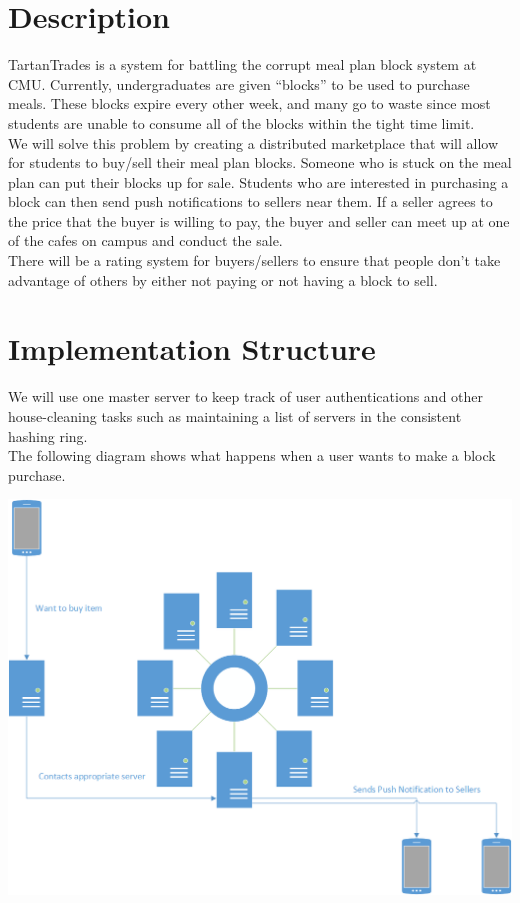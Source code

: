 \documentclass[12pt]{article}
\begin{document}
\maketitle

\section{Description}

TartanTrades is a system for battling the corrupt meal plan block system at CMU\@.  Currently, undergraduates are given ``blocks'' to be used to purchase meals.
These blocks expire every other week, and many go to waste since most students are unable to consume all of the blocks within the tight time limit.\\

We will solve this problem by creating a distributed marketplace that will allow for students to buy/sell their meal plan blocks.  Someone who is stuck on the meal
plan can put their blocks up for sale.  Students who are interested in purchasing a block can then send push notifications to sellers near them.  If a seller agrees
to the price that the buyer is willing to pay, the buyer and seller can meet up at one of the cafes on campus and conduct the sale.\\

There will be a rating system for buyers/sellers to ensure that people don't take advantage of others by either not paying or not having a block to sell.

\section{Implementation Structure}

We will use one master server to keep track of user authentications and other house-cleaning tasks such as maintaining a list of servers in the consistent hashing ring.\\

The following diagram shows what happens when a user wants to make a block purchase.

\begin{center}
\includegraphics[scale=.6]{./diagram-1.png}\\
\end{center}
\end{document}
